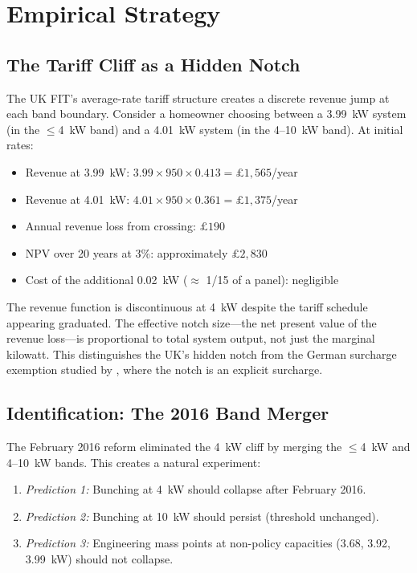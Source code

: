 \documentclass[12pt]{article}
\begin{document}
\section{Empirical Strategy}
\label{sec:strategy}

\subsection{The Tariff Cliff as a Hidden Notch}

The UK FIT's average-rate tariff structure creates a discrete revenue jump at each band boundary. Consider a homeowner choosing between a 3.99~kW system (in the $\leq$4~kW band) and a 4.01~kW system (in the 4--10~kW band). At initial rates:
\begin{itemize}
  \item Revenue at 3.99~kW: $3.99 \times 950 \times 0.413 = \pounds 1{,}565$/year
  \item Revenue at 4.01~kW: $4.01 \times 950 \times 0.361 = \pounds 1{,}375$/year
  \item Annual revenue loss from crossing: $\pounds 190$
  \item NPV over 20 years at 3\%: approximately $\pounds 2{,}830$
  \item Cost of the additional 0.02~kW ($\approx$ 1/15 of a panel): negligible
\end{itemize}

The revenue function is discontinuous at 4~kW despite the tariff schedule appearing graduated. The effective notch size---the net present value of the revenue loss---is proportional to total system output, not just the marginal kilowatt. This distinguishes the UK's hidden notch from the German surcharge exemption studied by \citet{klimsa2024tax}, where the notch is an explicit surcharge.

\subsection{Identification: The 2016 Band Merger}

The February 2016 reform eliminated the 4~kW cliff by merging the $\leq$4~kW and 4--10~kW bands. This creates a natural experiment:
\begin{enumerate}
  \item \textit{Prediction 1:} Bunching at 4~kW should collapse after February 2016.
  \item \textit{Prediction 2:} Bunching at 10~kW should persist (threshold unchanged).
  \item \textit{Prediction 3:} Engineering mass points at non-policy capacities (3.68, 3.92, 3.99~kW) should not collapse.
\end{enumerate}
\end{document}
